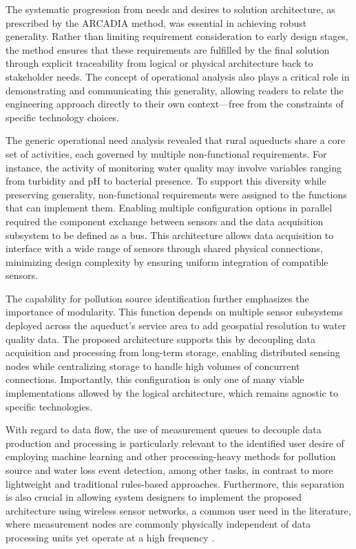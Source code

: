 \documentclass[conference]{IEEEtran}
\begin{document}
The systematic progression from needs and desires to solution architecture, as prescribed by the ARCADIA method, was essential in achieving robust generality. Rather than limiting requirement consideration to early design stages, the method ensures that these requirements are fulfilled by the final solution through explicit traceability from logical or physical architecture back to stakeholder needs. The concept of operational analysis also plays a critical role in demonstrating and communicating this generality, allowing readers to relate the engineering approach directly to their own context—free from the constraints of specific technology choices.

The generic operational need analysis revealed that rural aqueducts share a core set of activities, each governed by multiple non-functional requirements. For instance, the activity of monitoring water quality may involve variables ranging from turbidity and pH to bacterial presence. To support this diversity while preserving generality, non-functional requirements were assigned to the functions that can implement them. Enabling multiple configuration options in parallel required the component exchange between sensors and the data acquisition subsystem to be defined as a bus. This architecture allows data acquisition to interface with a wide range of sensors through shared physical connections, minimizing design complexity by ensuring uniform integration of compatible sensors.

The capability for pollution source identification further emphasizes the importance of modularity. This function depends on multiple sensor subsystems deployed across the aqueduct’s service area to add geospatial resolution to water quality data. The proposed architecture supports this by decoupling data acquisition and processing from long-term storage, enabling distributed sensing nodes while centralizing storage to handle high volumes of concurrent connections. Importantly, this configuration is only one of many viable implementations allowed by the logical architecture, which remains agnostic to specific technologies.

With regard to data flow, the use of measurement queues to decouple data
production and processing
is particularly relevant to the identified user desire of employing
machine learning and other processing-heavy methods for pollution source
and water loss event detection, among other tasks, in contrast to more lightweight and traditional rules-based approaches.
Furthermore, this separation is also crucial in allowing system designers to implement
the proposed architecture using wireless sensor networks, a common user need in the literature,
where measurement
nodes are commonly physically independent of data processing units yet operate
at a high frequency \cite{8308424}.
\end{document}
